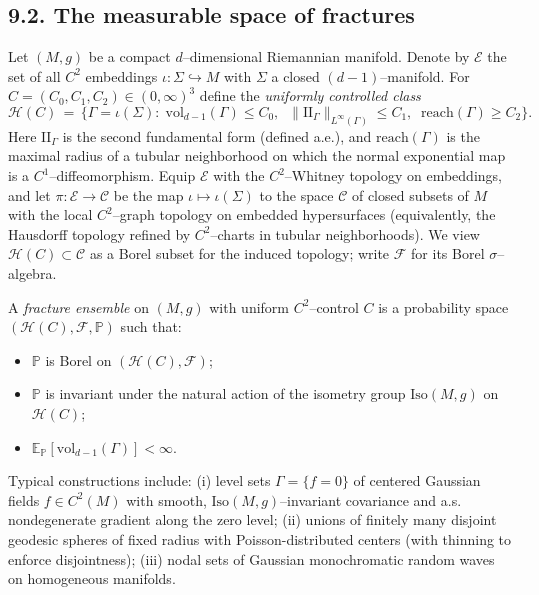 \subsection*{9.2. The measurable space of fractures}
Let $(M,g)$ be a compact $d$–dimensional Riemannian manifold. Denote by $\mathcal{E}$ the set of all $C^2$ embeddings $\iota:\Sigma\hookrightarrow M$ with $\Sigma$ a closed $(d-1)$–manifold. For $C=(C_0,C_1,C_2)\in(0,\infty)^3$ define the \emph{uniformly controlled class}
\[
\mathcal{H}(C)\,=\,\Big\{\Gamma=\iota(\Sigma):\;
\mathrm{vol}_{d-1}(\Gamma)\le C_0,\;\;\|\mathrm{II}_\Gamma\|_{L^\infty(\Gamma)}\le C_1,\;\;\mathrm{reach}(\Gamma)\ge C_2\Big\}.
\]
Here $\mathrm{II}_\Gamma$ is the second fundamental form (defined a.e.), and $\mathrm{reach}(\Gamma)$ is the maximal radius of a tubular neighborhood on which the normal exponential map is a $C^1$–diffeomorphism. Equip $\mathcal{E}$ with the $C^2$–Whitney topology on embeddings, and let $\pi:\mathcal{E}\to\mathcal{C}$ be the map $\iota\mapsto\iota(\Sigma)$ to the space $\mathcal{C}$ of closed subsets of $M$ with the local $C^2$–graph topology on embedded hypersurfaces (equivalently, the Hausdorff topology refined by $C^2$–charts in tubular neighborhoods). We view $\mathcal{H}(C)\subset\mathcal{C}$ as a Borel subset for the induced topology; write $\mathcal{F}$ for its Borel $\sigma$–algebra.

\begin{definition}\label{def:ensemble}
A \emph{fracture ensemble} on $(M,g)$ with uniform $C^2$–control $C$ is a probability space $(\mathcal{H}(C),\mathcal{F},\mathbb{P})$ such that:
\begin{itemize}
\item $\mathbb{P}$ is Borel on $(\mathcal{H}(C),\mathcal{F})$;
\item $\mathbb{P}$ is invariant under the natural action of the isometry group $\mathrm{Iso}(M,g)$ on $\mathcal{H}(C)$;
\item $\mathbb{E}_{\mathbb{P}}[\mathrm{vol}_{d-1}(\Gamma)]<\infty$.
\end{itemize}
\end{definition}

\noindent
Typical constructions include: (i) level sets $\Gamma=\{f=0\}$ of centered Gaussian fields $f\in C^2(M)$ with smooth, $\mathrm{Iso}(M,g)$–invariant covariance and a.s. nondegenerate gradient along the zero level; (ii) unions of finitely many disjoint geodesic spheres of fixed radius with Poisson-distributed centers (with thinning to enforce disjointness); (iii) nodal sets of Gaussian monochromatic random waves on homogeneous manifolds.


